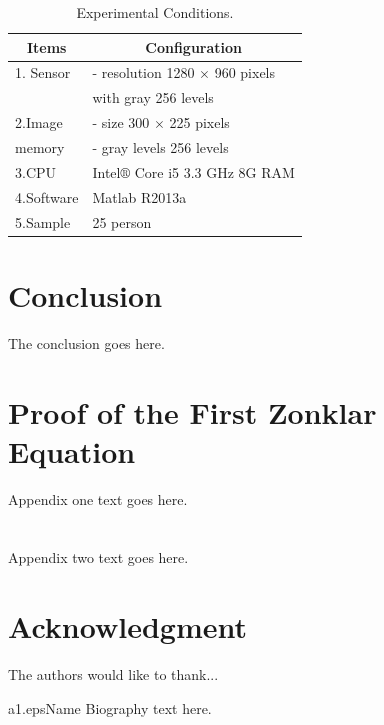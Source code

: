 \documentclass[10pt,twocolumn,twoside]{eec_style}
\begin{document}
\begin{table}[!htbp]
 \footnotesize
 \centering
 \caption{Experimental Conditions.}\label{tab:Table1}
 \vspace{4pt}
 \begin{tabular}{|l|l|}
   \hline
   \multicolumn{1}{|c|}{Items} & \multicolumn{1}{|c|}{Configuration} \\
   \hline
   1. Sensor & - resolution 1280 $\times$ 960 pixels \\
    & with gray 256 levels \\
   \hline
   2.Image & - size 300 $\times$ 225 pixels \\
   memory & - gray levels 256 levels \\
   \hline
   3.CPU & Intel$\circledR$ Core i5 3.3 GHz 8G  RAM  \\
   \hline
   4.Software & Matlab R2013a \\
   \hline
   5.Sample & 25 person \\
   \hline
 \end{tabular}
\end{table}





\section{Conclusion}
The conclusion goes here.


\appendices
\section{Proof of the First Zonklar Equation}
Appendix one text goes here.

\section{}
Appendix two text goes here.


\section*{Acknowledgment}


The authors would like to thank...








\begin{biography}{a1.eps}{Name}
Biography text here.
\end{biography}
\end{document}
